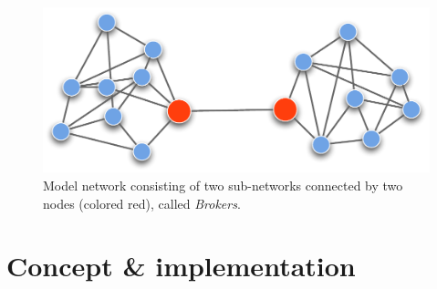 \begin{figure}[htpb]
\begin{center}
  \includegraphics[width=.75\textwidth]{assets/pdf/broker.pdf}
  \caption[Model network consisting of two sub-networks]{Model network consisting of two sub-networks connected by two nodes (colored red), called \textit{Brokers}.}
  \label{fig:broker}
\end{center}
\end{figure}
% 
% 
% 
% 
% 
% 	 

\section{Concept \& implementation}
\label{sec:graph_concept}

